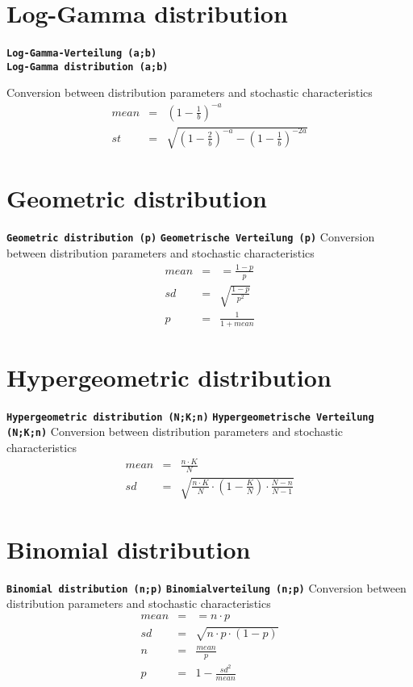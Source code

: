\documentclass{svmono}
\def\cm#1{\textbf{\texttt{#1}}}
\begin{document}
\section*{Log-Gamma distribution}
\cm{Log-Gamma-Verteilung (a;b)}~\\
\cm{Log-Gamma distribution (a;b)}

Conversion between distribution parameters and stochastic characteristics
\begin{eqnarray*}
mean&=&\left(1-\frac{1}{b}\right)^{-a}\\
st&=&\sqrt{\left(1-\frac{2}{b}\right)^{-a}-\left(1-\frac{1}{b}\right)^{-2a}}
\end{eqnarray*}



\section*{Geometric distribution}
\cm{Geometric distribution (p)}
\cm{Geometrische Verteilung (p)}
Conversion between distribution parameters and stochastic characteristics
\begin{eqnarray*}
mean&=&=\frac{1-p}{p}\\
sd&=&\sqrt{\frac{1-p}{p^2}}\\
p&=&\frac{1}{1+mean}
\end{eqnarray*}





\section*{Hypergeometric distribution}
\cm{Hypergeometric distribution (N;K;n)}
\cm{Hypergeometrische Verteilung (N;K;n)}
Conversion between distribution parameters and stochastic characteristics
\begin{eqnarray*}
mean&=&\frac{n\cdot K}{N}\\
sd&=&\sqrt{\frac{n\cdot K}{N}\cdot\left(1-\frac{K}{N}\right)\cdot\frac{N-n}{N-1}}
\end{eqnarray*}





\section*{Binomial distribution}
\cm{Binomial distribution (n;p)}
\cm{Binomialverteilung (n;p)}
Conversion between distribution parameters and stochastic characteristics
\begin{eqnarray*}
mean&=&=n\cdot p\\
sd&=&\sqrt{n\cdot p\cdot (1-p)}\\
n&=&\frac{mean}{p}\\
p&=&1-\frac{sd^2}{mean}
\end{eqnarray*}
\end{document}
